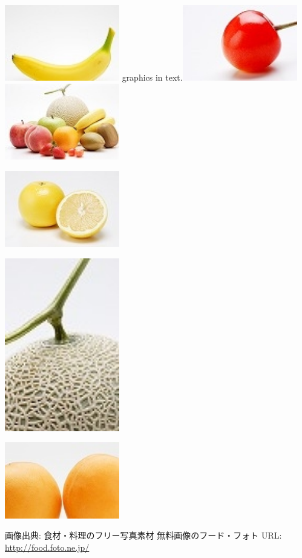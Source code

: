 \documentclass{jsarticle}
\begin{document}
\includegraphics[width=5cm]{img/banana.jpg} graphics in text.\includegraphics[width=5cm]{img/cherry.jpg} \includegraphics[width=5cm]{img/fruits.jpg}

\includegraphics[width=5cm]{img/grapefruits.jpg}

\includegraphics[width=5cm]{img/melon.jpg}

\includegraphics[width=5cm]{img/orange.jpg}

\vspace{4zw}

画像出典: 食材・料理のフリー写真素材 無料画像のフード・フォト URL: \url{http://food.foto.ne.jp/}
\end{document}
